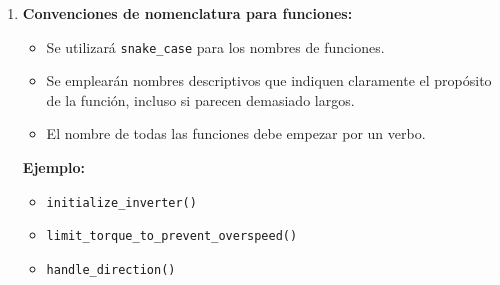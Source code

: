 \begin{enumerate}
\begin{itemize}
	\end{itemize}
	\item \textbf{Convenciones de nomenclatura para funciones:}
	\begin{itemize}
		\item Se utilizará \texttt{snake\_case} para los nombres de funciones.
		\item Se emplearán nombres descriptivos que indiquen claramente el propósito de la función, incluso si parecen demasiado largos.
		\item El nombre de todas las funciones debe empezar por un verbo.
	\end{itemize}
	\textbf{Ejemplo:}
	\begin{itemize}
		\item \texttt{initialize\_inverter()}
		\item \texttt{limit\_torque\_to\_prevent\_overspeed()}
		\item \texttt{handle\_direction()}
		

\end{itemize}
\end{enumerate}
